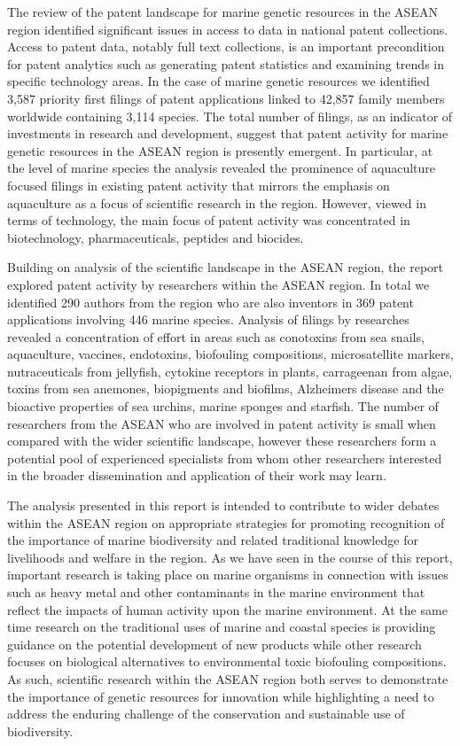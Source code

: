 \documentclass[openany]{book}
\theoremstyle{definition}
\theoremstyle{definition}
\theoremstyle{definition}
\theoremstyle{remark}
\begin{document}
The review of the patent landscape for marine genetic resources in the
ASEAN region identified significant issues in access to data in national
patent collections. Access to patent data, notably full text
collections, is an important precondition for patent analytics such as
generating patent statistics and examining trends in specific technology
areas. In the case of marine genetic resources we identified 3,587
priority first filings of patent applications linked to 42,857 family
members worldwide containing 3,114 species. The total number of filings,
as an indicator of investments in research and development, suggest that
patent activity for marine genetic resources in the ASEAN region is
presently emergent. In particular, at the level of marine species the
analysis revealed the prominence of aquaculture focused filings in
existing patent activity that mirrors the emphasis on aquaculture as a
focus of scientific research in the region. However, viewed in terms of
technology, the main focus of patent activity was concentrated in
biotechnology, pharmaceuticals, peptides and biocides.

Building on analysis of the scientific landscape in the ASEAN region,
the report explored patent activity by researchers within the ASEAN
region. In total we identified 290 authors from the region who are also
inventors in 369 patent applications involving 446 marine species.
Analysis of filings by researches revealed a concentration of effort in
areas such as conotoxins from sea snails, aquaculture, vaccines,
endotoxins, biofouling compositions, microsatellite markers,
nutraceuticals from jellyfish, cytokine receptors in plants, carrageenan
from algae, toxins from sea anemones, biopigments and biofilms,
Alzheimers disease and the bioactive properties of sea urchins, marine
sponges and starfish. The number of researchers from the ASEAN who are
involved in patent activity is small when compared with the wider
scientific landscape, however these researchers form a potential pool of
experienced specialists from whom other researchers interested in the
broader dissemination and application of their work may learn.

The analysis presented in this report is intended to contribute to wider
debates within the ASEAN region on appropriate strategies for promoting
recognition of the importance of marine biodiversity and related
traditional knowledge for livelihoods and welfare in the region. As we
have seen in the course of this report, important research is taking
place on marine organisms in connection with issues such as heavy metal
and other contaminants in the marine environment that reflect the
impacts of human activity upon the marine environment. At the same time
research on the traditional uses of marine and coastal species is
providing guidance on the potential development of new products while
other research focuses on biological alternatives to environmental toxic
biofouling compositions. As such, scientific research within the ASEAN
region both serves to demonstrate the importance of genetic resources
for innovation while highlighting a need to address the enduring
challenge of the conservation and sustainable use of biodiversity.
\end{document}
